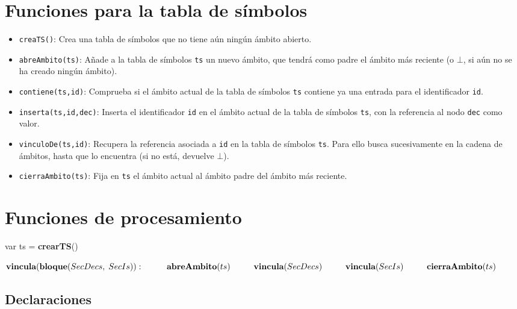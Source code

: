 \section{Funciones para la tabla de símbolos}

\begin{itemize}
    \item \texttt{creaTS()}: Crea una tabla de símbolos que no tiene aún ningún ámbito abierto.
    \item \texttt{abreAmbito(ts)}: Añade a la tabla de símbolos \texttt{ts} un nuevo ámbito, que tendrá como padre el ámbito más reciente (o $\bot$, si aún no se ha creado ningún ámbito).
    \item \texttt{contiene(ts,id)}: Comprueba si el ámbito actual de la tabla de símbolos \texttt{ts} contiene ya una entrada para el identificador \texttt{id}.
    \item \texttt{inserta(ts,id,dec)}: Inserta el identificador \texttt{id} en el ámbito actual de la tabla de símbolos \texttt{ts}, con la referencia al nodo \texttt{dec} como valor.
    \item \texttt{vinculoDe(ts,id)}: Recupera la referencia asociada a \texttt{id} en la tabla de símbolos \texttt{ts}. Para ello busca sucesivamente en la cadena de ámbitos, hasta que lo encuentra (si no está, devuelve $\bot$).
    \item \texttt{cierraAmbito(ts)}: Fija en \texttt{ts} el ámbito actual al ámbito padre del ámbito más reciente.
\end{itemize}

\section{Funciones de procesamiento}

var ts = \textbf{crearTS}()

\begin{math}
    \textbf{vincula}(\textbf{bloque}(SecDecs, \; SecIs)): \\
        \phantom{---} \textbf{abreAmbito}(ts) \\
        \phantom{---} \textbf{vincula}(SecDecs) \\
        \phantom{---} \textbf{vincula}(SecIs) \\
        \phantom{---} \textbf{cierraAmbito}(ts)
\end{math}

\subsection{Declaraciones}

